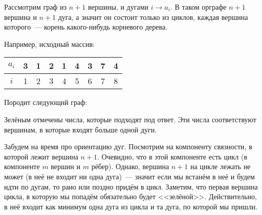 \documentclass[addpoints]{exam}
\begin{document}
\begin{questions}
\begin{solution}

Рассмотрим граф из $n+1$ вершины, и дугами $i \rightarrow a_i$. В таком орграфе $n+1$ вершина и $n+1$ дуга, а значит он состоит только из циклов, каждая вершина которого~--- корень какого-нибудь корневого дерева.

Например, исходный массив:

\begin{center}

\begin{tabular}{|c|c|c|c|c|c|c|c|c|}
\hline 
$a_i$ & 3 & 1 & 2 & 1 & 4 & 3 & 7 & 4 \\ 
\hline 
$i$ & 1 & 2 & 3 & 4 & 5 & 6 & 7 & 8 \\ 
\hline 
\end{tabular} 

\end{center}

Породит следующий граф:

\begin{center}


\end{center}

Зелёным отмечены числа, которые подходят под ответ. Эти числа соответствуют вершинам, в которые входят больше одной дуги.

Забудем на время про ориентацию дуг. Посмотрим на компоненту связности, в которой лежит вершина $n+1$. Очевидно, что в этой компоненте есть цикл (в компоненте $m$ вершин и $m$ рёбер). Однако, вершина $n+1$ на цикле лежать не может (в неё не входит ни одна дуга)~--- значит если мы встанём в неё и будем идти по дугам, то рано или поздно придём в цикл. Заметим, что первая вершина цикла, в которую мы попадём обязательно будет <<зелёной>>. Действительно, в неё входит как минимум одна дуга из цикла и та дуга, по которой мы пришли.


\end{solution}
\end{questions}
\end{document}
